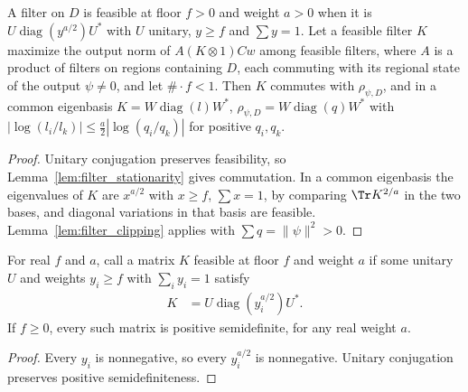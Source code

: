 \begin{proposition}
    \label{prop:stationary_filter_clipped}
    \leanok
    A filter on $D$ is feasible at floor $f>0$ and weight $a>0$ when it is
    $U\operatorname{diag}(y^{a/2})U^*$ with $U$ unitary, $y\ge f$ and $\sum y=1$.
    Let a feasible filter $K$ maximize the output norm of
    $A(K\otimes1)Cw$ among feasible filters, where $A$ is a product of filters
    on regions containing $D$, each commuting with its regional state of the
    output $\psi\ne0$, and let $\#\cdot f<1$. Then $K$ commutes with
    $\rho_{\psi,D}$, and in a common eigenbasis $K=W\operatorname{diag}(l)W^*$,
    $\rho_{\psi,D}=W\operatorname{diag}(q)W^*$ with
    $|\log(l_i/l_k)|\le\frac a2|\log(q_i/q_k)|$ for positive $q_i,q_k$.
\end{proposition}
\begin{proof}\leanok
    Unitary conjugation preserves feasibility, so Lemma~\ref{lem:filter_stationarity}
    gives commutation. In a common eigenbasis the eigenvalues of $K$ are
    $x^{a/2}$ with $x\ge f$, $\sum x=1$, by comparing $\Tr K^{2/a}$ in the two
    bases, and diagonal variations in that basis are feasible.
    Lemma~\ref{lem:filter_clipping} applies with $\sum q=\lVert\psi\rVert^2>0$.
\end{proof}

\begin{theorem}
    \label{thm:feasible_filter_posSemidef}
    \leanok
    For real $f$ and $a$, call a matrix $K$ feasible at floor $f$ and
    weight $a$ if some unitary $U$ and weights $y_i\ge f$ with
    $\sum_i y_i=1$ satisfy
    \begin{align}
        K & =U\operatorname{diag}(y_i^{a/2})U^*.
        \label{eq:feasible_filter_coordinates}
    \end{align}
    If $f\ge0$, every such matrix is positive semidefinite, for any real
    weight $a$.
\end{theorem}
\begin{proof}
    \leanok
    Every $y_i$ is nonnegative, so every $y_i^{a/2}$ is nonnegative.
    Unitary conjugation preserves positive semidefiniteness.
\end{proof}

